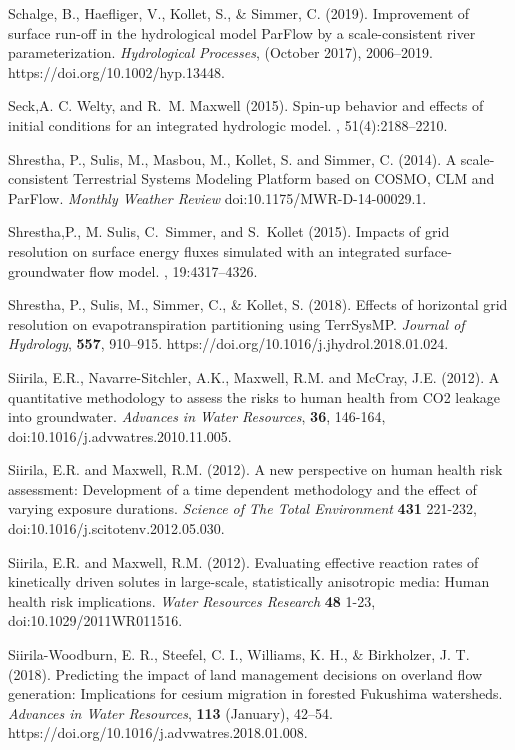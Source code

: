 \begin{thebibliography}{999}
Schalge, B., Haefliger, V., Kollet, S., \& Simmer, C. (2019). Improvement of surface run-off in the hydrological model ParFlow by a scale-consistent river parameterization. {\em Hydrological Processes}, (October 2017), 2006–2019. https://doi.org/10.1002/hyp.13448.

Seck,A. C. Welty, and R.~M. Maxwell (2015).
\newblock Spin-up behavior and effects of initial conditions for an integrated
  hydrologic model.
, 51(4):2188--2210.


Shrestha, P., Sulis, M., Masbou, M., Kollet, S. and Simmer, C. (2014). A scale-consistent Terrestrial Systems Modeling Platform based on COSMO, CLM and ParFlow. {\em Monthly Weather Review} doi:10.1175/MWR-D-14-00029.1.

Shrestha,P., M. Sulis, C.~Simmer, and S.~Kollet (2015).
\newblock Impacts of grid resolution on surface energy fluxes simulated with an
  integrated surface-groundwater flow model.
, 19:4317--4326.

Shrestha, P., Sulis, M., Simmer, C., \& Kollet, S. (2018). Effects of horizontal grid resolution on evapotranspiration partitioning using TerrSysMP. {\em Journal of Hydrology}, {\bf 557}, 910–915. https://doi.org/10.1016/j.jhydrol.2018.01.024.

Siirila, E.R., Navarre-Sitchler, A.K., Maxwell, R.M. and McCray, J.E. (2012). A quantitative methodology to assess the risks to human health from CO2 leakage into groundwater. {\em Advances in Water Resources}, {\bf 36}, 146-164, doi:10.1016/j.advwatres.2010.11.005.

Siirila, E.R. and Maxwell, R.M. (2012). A new perspective on human health risk assessment: Development of a time dependent methodology and the effect of varying exposure durations. {\em Science of The Total Environment} {\bf 431} 221-232, doi:10.1016/j.scitotenv.2012.05.030.

Siirila, E.R. and Maxwell, R.M. (2012). Evaluating effective reaction rates of kinetically driven solutes in large-scale, statistically anisotropic media: Human health risk implications. {\em Water Resources Research} {\bf 48} 1-23, doi:10.1029/2011WR011516.

Siirila-Woodburn, E. R., Steefel, C. I., Williams, K. H., \& Birkholzer, J. T. (2018). Predicting the impact of land management decisions on overland flow generation: Implications for cesium migration in forested Fukushima watersheds. {\em Advances in Water Resources}, {\bf 113} (January), 42–54. https://doi.org/10.1016/j.advwatres.2018.01.008.


\end{thebibliography}

